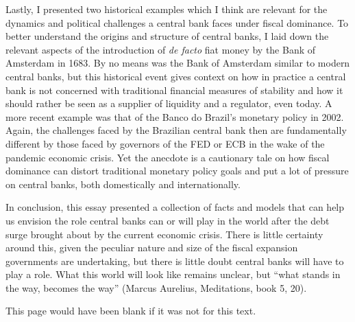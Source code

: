 \documentclass[american]{scrartcl}
\begin{document}
Lastly, I presented two historical examples which I think are relevant for the dynamics and political challenges a central bank faces under fiscal dominance. To better understand the origins and structure of central banks, I laid down the relevant aspects of the introduction of \textit{de facto} fiat money by the Bank of Amsterdam in 1683. By no means was the Bank of Amsterdam similar to modern central banks, but this historical event gives context on how in practice a central bank is not concerned with traditional financial measures of stability and how it should rather be seen as a supplier of liquidity and a regulator, even today. A more recent example was that of the Banco do Brazil's monetary policy in 2002. Again, the challenges faced by the Brazilian central bank then are fundamentally different by those faced by governors of the FED or ECB in the wake of the pandemic economic crisis. Yet the anecdote is a cautionary tale on how fiscal dominance can distort traditional monetary policy goals and put a lot of pressure on central banks, both domestically and internationally.

In conclusion, this essay presented a collection of facts and models that can help us envision the role central banks can or will play in the world after the debt surge brought about by the current economic crisis. There is little certainty around this, given the peculiar nature and size of the fiscal expansion governments are undertaking, but there is little doubt central banks will have to play a role. What this world will look like remains unclear, but ``what stands in the way, becomes the way'' (Marcus Aurelius, Meditations, book 5, 20).

\newpage
\printbibliography

\newpage
This page would have been blank if it was not for this text.
\end{document}
